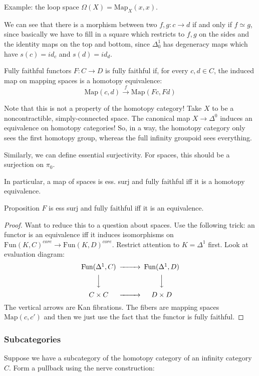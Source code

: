 Example: the loop space $\Omega(X)=\mathrm{Map}_X(x,x)$. 

We can see that there is a morphism between two $f,g:c\rightarrow d$ if and only if $f\simeq g$, since basically we have to fill in a square which restricts to $f,g$ on the sides and the identity maps on the top and bottom, since $\Delta^1_0$ has degeneracy maps which have $s(c)=id_c$ and $s(d)=id_d$.

\begin{definition}{Fully faithful functors}{}
    $F:C\rightarrow D$ is fully faithful if, for every $c,d\in C$, the induced map on mapping spaces is a homotopy equivalence: $$\mathrm{Map}(c,d)\xrightarrow{f} \mathrm{Map}(Fc,Fd)$$ 
\end{definition}


Note that this is not a property of the homotopy category! Take $X$ to be a noncontractible, simply-connected space. The canonical map $X\rightarrow \Delta^0$ induces an equivalence on homotopy categories! So, in a way, the homotopy category only sees the first homotopy group, whereas the full infinity groupoid sees everything.

Similarly, we can define essential surjectivity. For spaces, this should be a surjection on $\pi_0$. 

In particular, a map of spaces is ess. surj and fully faithful iff it is a homotopy equivalence.

\begin{proposition}{Proposition}{}
    $F$ is ess surj and fully faithful iff it is an equivalence.
\end{proposition}

\begin{proof}
    Want to reduce this to a question about spaces. Use the following trick: an functor is an equivalence iff it induces isomorphisms on $\mathrm{Fun}(K,C)^{core}\rightarrow \mathrm{Fun}(K,D)^{core}$. Restrict attention to $K=\Delta^1$ first.  Look at evaluation diagram: $$\begin{CD} \mathrm{Fun}(\Delta^1,C) @>>> \mathrm{Fun}(\Delta^1, D)\\ @VVV @VVV \\ C\times C @>>> D\times D\end{CD}$$The vertical arrows are Kan fibrations. The fibers are mapping spaces $\mathrm{Map}(c,c')$ and then we just use the fact that the functor is fully faithful.
\end{proof}

\subsubsection{Subcategories}
Suppose we have a subcategory of the homotopy category of an infinity category $C$. Form a pullback using the nerve construction: 

